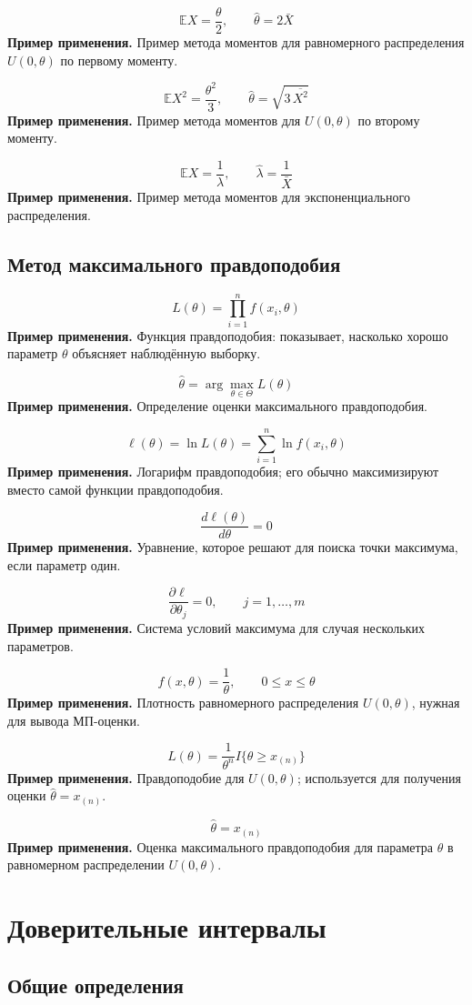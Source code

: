 \documentclass[a4paper,14pt]{extarticle}
\newcommand{\FormulaNote}[2]{%
  \begin{equation*}
  #1
  \end{equation*}
  \noindent\textbf{Пример применения.} #2\par\medskip
}
\begin{document}
\FormulaNote{\mathbb{E}X=\frac{\theta}{2},\qquad \hat{\theta}=2\bar{X}}{Пример метода моментов для равномерного распределения $U(0,\theta)$ по первому моменту.}

\FormulaNote{\mathbb{E}X^2=\frac{\theta^2}{3},\qquad \hat{\theta}=\sqrt{3\,\overline{X^2}}}{Пример метода моментов для $U(0,\theta)$ по второму моменту.}

\FormulaNote{\mathbb{E}X=\frac{1}{\lambda},\qquad \hat{\lambda}=\frac{1}{\bar{X}}}{Пример метода моментов для экспоненциального распределения.}

\subsection{Метод максимального правдоподобия}

\FormulaNote{L(\theta)=\prod_{i=1}^{n}f(x_i,\theta)}{Функция правдоподобия: показывает, насколько хорошо параметр $\theta$ объясняет наблюдённую выборку.}

\FormulaNote{\hat{\theta}=\arg\max_{\theta\in\Theta}L(\theta)}{Определение оценки максимального правдоподобия.}

\FormulaNote{\ell(\theta)=\ln L(\theta)=\sum_{i=1}^{n}\ln f(x_i,\theta)}{Логарифм правдоподобия; его обычно максимизируют вместо самой функции правдоподобия.}

\FormulaNote{\frac{d\ell(\theta)}{d\theta}=0}{Уравнение, которое решают для поиска точки максимума, если параметр один.}

\FormulaNote{\frac{\partial \ell}{\partial \theta_j}=0,\qquad j=1,\dots,m}{Система условий максимума для случая нескольких параметров.}

\FormulaNote{f(x,\theta)=\frac{1}{\theta},\qquad 0\le x\le \theta}{Плотность равномерного распределения $U(0,\theta)$, нужная для вывода МП-оценки.}

\FormulaNote{L(\theta)=\frac{1}{\theta^n}I\{\theta\ge x_{(n)}\}}{Правдоподобие для $U(0,\theta)$; используется для получения оценки $\hat{\theta}=x_{(n)}$.}

\FormulaNote{\hat{\theta}=x_{(n)}}{Оценка максимального правдоподобия для параметра $\theta$ в равномерном распределении $U(0,\theta)$.}

\section{Доверительные интервалы}

\subsection{Общие определения}
\end{document}
